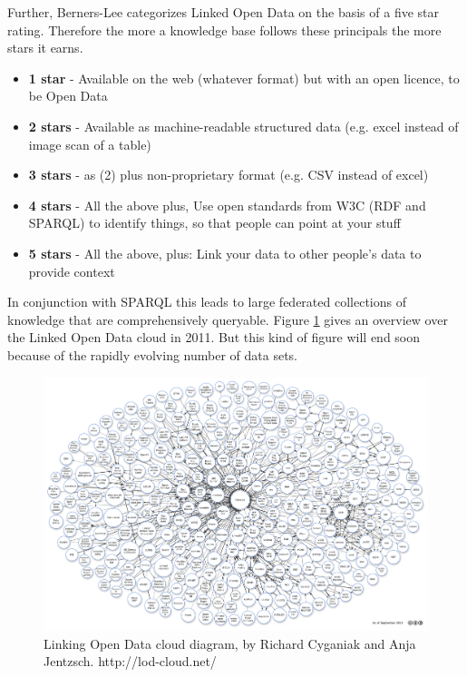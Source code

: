 Further, Berners-Lee categorizes Linked Open Data on the basis of a five star rating.
Therefore the more a knowledge base follows these principals the more stars it earns.
\begin{itemize}
\item \textbf{1 star} - Available on the web (whatever format) but with an open licence, to be Open Data
\item \textbf{2 stars} - Available as machine-readable structured data (e.g. excel instead of image scan of a table)
\item \textbf{3 stars} - as (2) plus non-proprietary format (e.g. CSV instead of excel)
\item \textbf{4 stars} - All the above plus, Use open standards from W3C (RDF and SPARQL) to identify things, so that people can point at your stuff
\item \textbf{5 stars} - All the above, plus: Link your data to other people’s data to provide context
\end{itemize}

In conjunction with SPARQL this leads to large federated collections of knowledge that are comprehensively queryable.
Figure \ref{fig:lod_cloud} gives an overview over the Linked Open Data cloud in 2011.
But this kind of figure will end soon because of the rapidly evolving number of data sets.
\begin{figure}
  \centering
  \includegraphics[width=\textwidth]{preliminaries/lod-cloud}
  \caption{Linking Open Data cloud diagram, by Richard Cyganiak and Anja Jentzsch. http://lod-cloud.net/}
  \label{fig:lod_cloud}
\end{figure}

